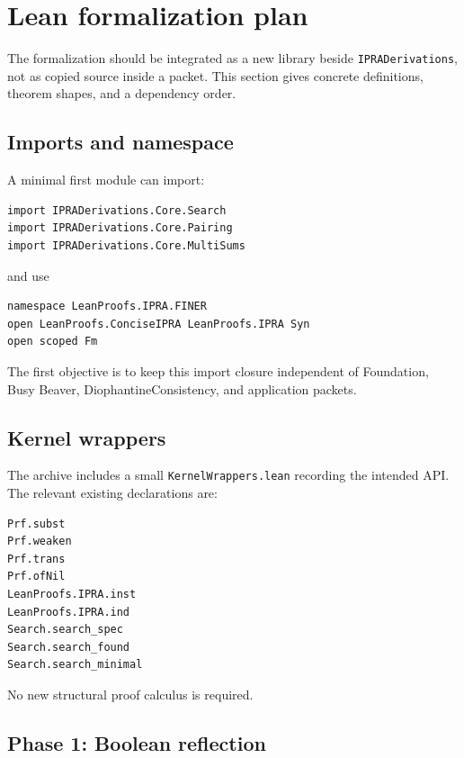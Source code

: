 \section{Lean formalization plan}
\label{sec:lean}

The formalization should be integrated as a new library beside \texttt{IPRADerivations}, not as copied source inside a packet.  This section gives concrete definitions, theorem shapes, and a dependency order.

\subsection{Imports and namespace}

A minimal first module can import:
\begin{lstlisting}[language={}]
import IPRADerivations.Core.Search
import IPRADerivations.Core.Pairing
import IPRADerivations.Core.MultiSums
\end{lstlisting}
and use
\begin{lstlisting}[language={}]
namespace LeanProofs.IPRA.FINER
open LeanProofs.ConciseIPRA LeanProofs.IPRA Syn
open scoped Fm
\end{lstlisting}
The first objective is to keep this import closure independent of Foundation, Busy Beaver, DiophantineConsistency, and application packets.

\subsection{Kernel wrappers}

The archive includes a small \texttt{KernelWrappers.lean} recording the intended API.  The relevant existing declarations are:
\begin{lstlisting}[language={}]
Prf.subst
Prf.weaken
Prf.trans
Prf.ofNil
LeanProofs.IPRA.inst
LeanProofs.IPRA.ind
Search.search_spec
Search.search_found
Search.search_minimal
\end{lstlisting}
No new structural proof calculus is required.

\subsection{Phase 1: Boolean reflection}

